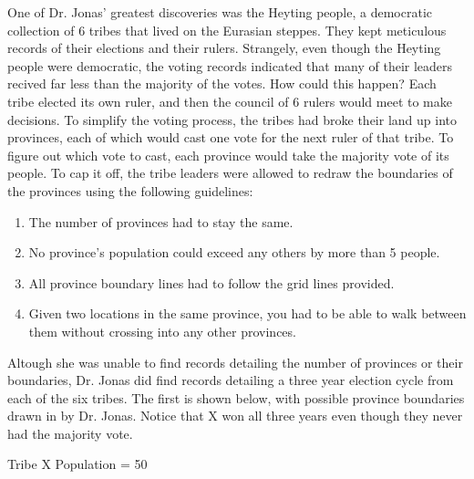 One of Dr. Jonas' greatest discoveries was the Heyting people, a democratic collection of 6 tribes that lived on the Eurasian steppes.
They kept meticulous records of their elections and their rulers.
Strangely, even though the Heyting people were democratic, the voting records indicated that many of their leaders recived far less than the majority of the votes.
How could this happen?
Each tribe elected its own ruler, and then the council of 6 rulers would meet to make decisions.
To simplify the voting process, the tribes had broke their land up into provinces, each of which would cast one vote for the next ruler of that tribe.
To figure out which vote to cast, each province would take the majority vote of its people.
To cap it off, the tribe leaders were allowed to redraw the boundaries of the provinces using the following guidelines:
\begin{enumerate}
\item The number of provinces had to stay the same.
\item No province's population could exceed any others by more than 5 people.
\item All province boundary lines had to follow the grid lines provided.
\item Given two locations in the same province, you had to be able to walk between them without crossing into any other provinces.
\end{enumerate}

Altough she was unable to find records detailing the number of provinces or their boundaries, Dr. Jonas did find records detailing a three year election cycle from each of the six tribes.
The first is shown below, with possible province boundaries drawn in by Dr. Jonas.
Notice that X won all three years even though they never had the majority vote.

Tribe X
Population = 50

